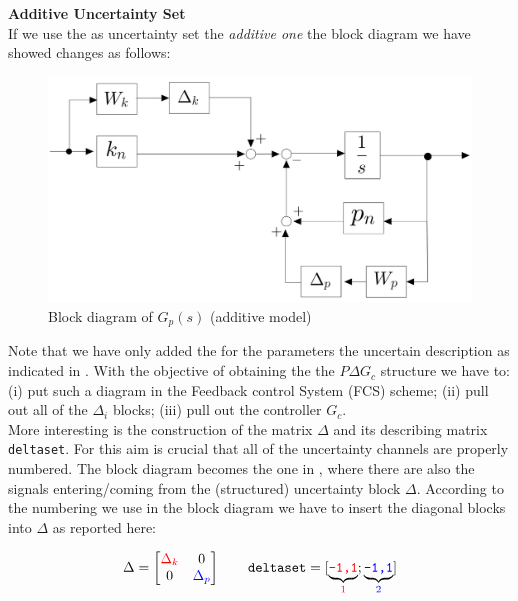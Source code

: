 \documentclass[a4paper, 12pt]{article}
\begin{document}
\noindent
\textsf{\large \textbf{Additive Uncertainty Set}}\\
If we use the as uncertainty set the \textit{additive one} the block diagram we have showed changes as follows: 

\begin{figure}[h]
    \centering
    \includegraphics[scale=0.23]{img/ex1_add.jpg}
    \caption{Block diagram of $G_p(s)$ (additive model)}
\end{figure}
\noindent
Note that we have only added the for the parameters the uncertain description as indicated in . With the objective of obtaining the the $P\Delta{G_c}$ structure we have to: (i) put such a diagram in the Feedback control System (FCS) scheme; (ii) pull out all of the $\Delta_i$ blocks; (iii) pull out the controller $G_c$. \\
More interesting is the construction of the matrix $\Delta$ and its describing matrix \texttt{deltaset}. For this aim is crucial that all of the uncertainty channels are properly numbered. The block diagram becomes the one in , where there are also the signals entering/coming from the (structured) uncertainty block $\Delta$. According to the numbering we use in the block diagram we have to insert the diagonal blocks into $\Delta$ as reported here:

\begin{equation}
    \Delta=\begin{bmatrix}
        {\color{red}{\Delta_k}}&0\\
        0&{\color{blue}{\Delta_p}}
    \end{bmatrix} \qquad
    \texttt{deltaset}=[
        \underbrace{\texttt{{\color{red}{-1,1}}}}_{\color{red}1}; 
        \underbrace{\texttt{{\color{blue}-1,1}}}_{\color{blue}2}]
\end{equation}
\end{document}
